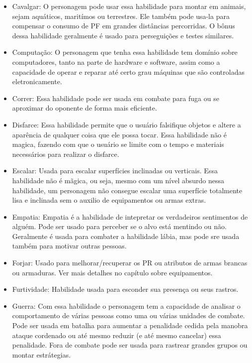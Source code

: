 \begin{itemize}
	\item Cavalgar: O personagem pode usar essa habilidade para montar em animais, sejam aquáticos, maritímos ou terrestres. Ele também pode usa-la para compensar o consumo de PF em grandes distâncias percorridas. O bônus dessa habilidade geralmente é usado para perseguições e testes similares.
	
	\item Computação: O personagem que tenha essa habilidade tem domínio sobre computadores, tanto na parte de hardware e software, assim como a capacidade de operar e reparar até certo grau máquinas que são controladas eletronicamente.  
	
	\item Correr: Essa habilidade pode ser usada em combate para fuga ou se aproximar do oponente de forma mais eficiente.
	
	\item Disfarce: Essa habilidade permite que o usuário falsifique objetos e altere a aparência de qualquer coisa que ele possa tocar. Essa habilidade não é magica, fazendo com que o usuário se limite com o tempo e materiais necessários para realizar o disfarce.
	
	\item Escalar: Usada para escalar superfícies inclinadas ou verticais. Essa habilidade não é mãgica, ou seja, mesmo com um nível absurdo nessa habilidade, um personagem não consegue escalar uma superfície totalmente lisa e inclinada sem o auxilio de equipamentos ou armas extras.
	
	\item Empatia: Empatia é a habilidade de intepretar os verdadeiros sentimentos de alguém. Pode ser usado para perceber se o alvo está mentindo ou não. Geralmente é usada para combater a habilidade lábia, mas pode sre usada também para motivar outras pessoas.
	
	\item Forjar: Usado para melhorar/recuperar os PR ou atributos de armas brancas ou armaduras. Ver mais detalhes no capítulo sobre equipamentos.
	
	\item Furtividade: Habilidade usada para esconder sua presença ou seus rastros.
		
	\item Guerra: Com essa habilidade o personagem tem a capacidade de analisar o comportamento de várias pessoas como uma ou várias unidades de combate. Pode ser usada em batalha para aumentar a penalidade cedida pela manobra ataque cordenado ou até mesmo reduzir (e até mesmo cancelar) essa penalidade. Fora de combate pode ser usada para rastrear grandes grupos ou montar estrátegias.


\end{itemize}
